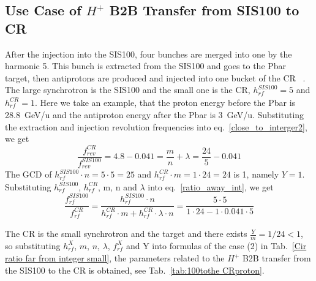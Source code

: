 \subsection{Use Case of $H^{+}$ B2B Transfer from SIS100 to CR} 
After the injection into the SIS100, four bunches are merged into one by the harmonic 5. This bunch is extracted from the SIS100 and goes to the Pbar target, then antiprotons are produced and injected into one bucket of the CR ~\cite{steck_demonstration_2011}. The large synchrotron is the SIS100 and the small one is the CR, $h^{\mathit{SIS100}}_\mathit{rf}=5$ and $h^{\mathit{CR}}_\mathit{rf}=1$. Here we take an example, that the proton energy before the Pbar is \SI{28.8}{GeV/\atomicmassunit} and the antiproton energy after the Pbar is \SI{3}{GeV/\atomicmassunit}. Substituting the extraction and injection revolution frequencies into eq.~\ref{close_to_interger2}, we get
\begin{equation} 
\frac{f_{\mathit{rev}}^{\mathit{CR}}}{f_{\mathit{rev}}^{\mathit{SIS100}}}=4.8-0.041=\frac{m}{n}+ \lambda=\frac{24}{5}-0.041
\end{equation}
The GCD of $h^{\mathit{SIS100}}_\mathit{rf}\cdot n=5\cdot5=25$ and $h^{\mathit{CR}}_\mathit{rf} \cdot m=1\cdot 24=24$ is 1, namely $Y=1$. Substituting $h^{\mathit{SIS100}}_\mathit{rf}$, $h^{\mathit{CR}}_\mathit{rf}$, m, n and $\lambda$ into eq.~\ref{ratio_away_int}, we get
\begin{equation} 
\frac{f_{\mathit{rf}}^{\mathit{SIS100}}}{f_{\mathit{rf}}^{\mathit{CR}}}=\frac{h^{\mathit{SIS100}}_\mathit{rf}\cdot n}{h^{\mathit{CR}}_\mathit{rf} \cdot m+ h^{\mathit{CR}}_\mathit{rf} \cdot\lambda\cdot n}=\frac{5\cdot 5}{1 \cdot 24- 1 \cdot0.041\cdot 5}
\end{equation}

The CR is the small synchrotron and the target and there exists $\frac{Y}{m}=1/24<1$, so substituting $h^X_\mathit{rf}$, $m$, $n$, $\lambda$, $f_{\mathit{rf}}^{X}$ and Y into formulas of the case (2) in Tab.~\ref{Cir ratio far from integer small}, the parameters related to the $H^{+}$ B2B transfer from the SIS100 to the CR is obtained, see Tab.~\ref{tab:100tothe CRproton}.

